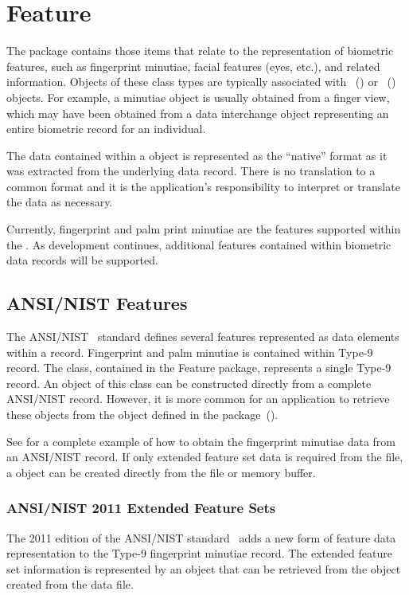 %
%
\chapter{Feature}
\label{chp-feature}
The  package contains those items that relate to the representation of
biometric features, such as fingerprint minutiae, facial features (eyes, etc.),
and related information. Objects of these class types are typically associated
with ~() or
~()
objects. For example, a minutiae object is usually obtained from a finger view,
which may have been obtained from a data interchange object representing an
entire biometric record for an individual.

The data contained within a  object is represented as the
``native'' format as it was extracted from the underlying data record. There
is no translation to a common format and it is the application's responsibility 
to interpret or translate the data as necessary.

Currently, fingerprint and palm print minutiae are the features supported within
the \sname. As development continues, additional features contained within
biometric data records will be supported.

\section{ANSI/NIST Features}
\label{sec-ansinistfeatures}
The ANSI/NIST~\cite{std:an2k} standard defines several features represented
as data elements within a record. Fingerprint and palm minutiae is contained
within Type-9 record. The  class, contained in the Feature
package, represents a single Type-9 record. An object of this class can be
constructed directly from a complete ANSI/NIST record. However, it is more
common for an application to retrieve these objects from the 
object defined in the  package~().

See  for a complete example of how to obtain
the fingerprint minutiae data from an ANSI/NIST record. If only extended
feature set data is required from the file, a
 object can be created directly
from the file or memory buffer.

\subsection{ANSI/NIST 2011 Extended Feature Sets}
The 2011 edition of the ANSI/NIST standard~\cite{std:an2k11} adds a new form
of feature data representation to the Type-9 fingerprint minutiae record. The
extended feature set information is represented by an object that can be
retrieved from the  object created from the data
file.

